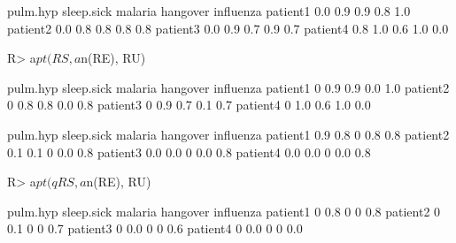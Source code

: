 \documentclass{article}\usepackage[]{graphicx}\usepackage[]{color}
\begin{document}
\begin{Schunk}
% --begin: "comp.circ.unavoid"
\begin{Soutput}
         pulm.hyp sleep.sick malaria hangover influenza
patient1      0.0        0.9     0.9      0.8       1.0
patient2      0.0        0.8     0.8      0.8       0.8
patient3      0.0        0.9     0.7      0.9       0.7
patient4      0.8        1.0     0.6      1.0       0.0
\end{Soutput}
%
% --end: "comp.circ.unavoid"
\end{Schunk}

\begin{Schunk}
% --begin: "comp.circ.excl.unavoid"
\begin{Sinput}
R> a$pt(RS, a$n(RE), RU)
\end{Sinput}
\begin{Soutput}
         pulm.hyp sleep.sick malaria hangover influenza
patient1        0        0.9     0.9      0.0       1.0
patient2        0        0.8     0.8      0.0       0.8
patient3        0        0.9     0.7      0.1       0.7
patient4        0        1.0     0.6      1.0       0.0
\end{Soutput}
%
% --end: "comp.circ.excl.unavoid"
\end{Schunk}

\begin{Schunk}
% --begin: "comp.quant.atleast"
\begin{Soutput}
         pulm.hyp sleep.sick malaria hangover influenza
patient1      0.9        0.8       0      0.8       0.8
patient2      0.1        0.1       0      0.0       0.8
patient3      0.0        0.0       0      0.0       0.8
patient4      0.0        0.0       0      0.0       0.8
\end{Soutput}
%
% --end: "comp.quant.atleast"
\end{Schunk}

\begin{Schunk}
% --begin: "comp.quant.combined"
\begin{Sinput}
R> a$pt(qRS, a$n(RE), RU)
\end{Sinput}
\begin{Soutput}
         pulm.hyp sleep.sick malaria hangover influenza
patient1        0        0.8       0        0       0.8
patient2        0        0.1       0        0       0.7
patient3        0        0.0       0        0       0.6
patient4        0        0.0       0        0       0.0
\end{Soutput}
%
% --end: "comp.quant.combined"
\end{Schunk}
\end{document}
